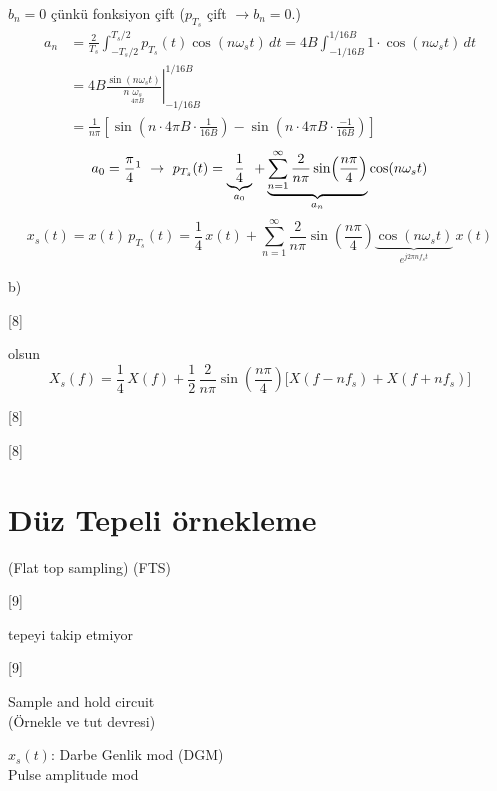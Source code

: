 \documentclass[11pt,a4paper]{article}
\begin{document}
\noindent $b_n=0$ \quad çünkü fonksiyon çift ($p_{T_s}$ çift $\rightarrow b_n=0$.)
\begin{align*}
a_n &= \frac{2}{T_s}\int_{-T_s/2}^{T_s/2}p_{T_s}(t)\cos(n\omega_st)\,dt=4B\int_{-1/16B}^{1/16B}1\cdot\cos(n\omega_st)\,dt\\
&= 4B\left.\frac{\sin(n\omega_st)}{n\,\underset{4\pi B}{\omega_s}}\right|_{-1/16B}^{1/16B}\\
&= \frac{1}{n\pi}\left[\sin\!\left(n\cdot4\pi B\cdot\frac{1}{16B}\right)-\sin\!\left(n\cdot4\pi B\cdot\frac{-1}{16B}\right)\right]
\end{align*}
\[ a_0=\frac{\pi}{4}\footnotemark\ \rightarrow\ p_{T_s}(t)=\underbrace{\frac{1}{4}}_{a_0}+\underbrace{\sum_{n=1}^{\infty}\frac{2}{n\pi}\sin\!\left(\frac{n\pi}{4}\right)}_{a_n}\cos(n\omega_st) \]
\[ x_s(t)=x(t)\,p_{T_s}(t)=\frac{1}{4}\,x(t)+\sum_{n=1}^{\infty}\frac{2}{n\pi}\sin\!\left(\frac{n\pi}{4}\right)\underbrace{\cos(n\omega_st)}_{e^{j2\pi nf_st}}\,x(t) \]

\noindent b)

[8]

\noindent olsun
\[ X_s(f)=\frac{1}{4}\,X(f)+\frac{1}{2}\,\frac{2}{n\pi}\sin\!\left(\frac{n\pi}{4}\right)\bigl[X(f-nf_s)+X(f+nf_s)\bigr] \]

[8]

[8]

\section{Düz Tepeli örnekleme}
\noindent (Flat top sampling) (FTS)

[9]

\noindent tepeyi takip etmiyor

[9]

\noindent Sample and hold circuit \\ (Örnekle ve tut devresi)

\noindent $x_s(t)$: Darbe Genlik mod (DGM) \\ Pulse amplitude mod
\end{document}
